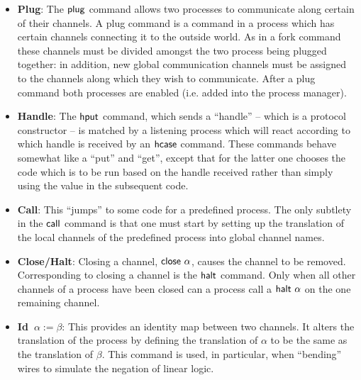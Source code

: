 \documentclass[11pt]{article}
\newcommand{\<}{\langle}
\renewcommand{\>}{\rangle}
\begin{document}
\begin{itemize}
\item {\bf Plug}: The ${\sf plug}$ command allows two processes to communicate along certain of their channels. A plug command is a command in a process which has certain channels connecting it to the outside world.  As in a fork command 
these channels must be divided amongst the two process being plugged together: in addition, new global communication channels must be assigned to the channels along which they wish to communicate. After a plug command both 
processes are enabled (i.e. added into the process manager).

\item {\bf Handle}: The ${\sf hput}$ command, which sends a ``handle'' -- which is a protocol constructor -- is matched by a listening process which will react according to which handle is received by an ${\sf hcase}$ command.  These commands behave 
somewhat like a ``put''  and ``get'', except that for the latter one chooses the code which is to be run based on the handle received rather than simply using the value in the subsequent code.

\item {\bf Call}: This ``jumps'' to some code for a predefined process.  The only subtlety in the ${\sf call}$ command is that one must start by setting up the translation of the local channels of the predefined process into global channel names.

\item {\bf Close/Halt}: Closing a channel, ${\sf close}~\alpha$, causes the channel to be removed.  Corresponding to closing a channel is the ${\sf halt}$ command.  Only when all other channels of a process have been closed can a process call a ${\sf halt} ~\alpha$ on the one remaining channel.

\item {\bf Id~$\alpha := \beta$}: This provides an identity map between two channels.  It alters the translation of the process by defining the translation of $\alpha$ to be the same as the translation of $\beta$.   This command is used, in particular, when ``bending'' wires to simulate the negation of linear logic.
\end {itemize}
\end{document}
